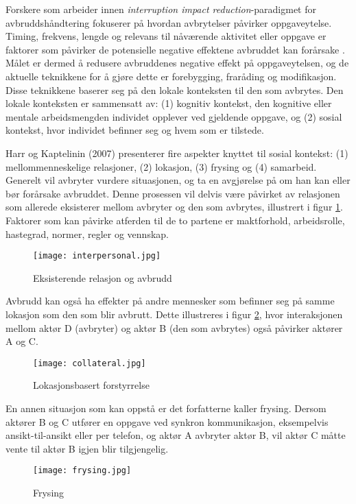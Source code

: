 \noindent
Forskere som arbeider innen \emph{interruption impact reduction}-paradigmet for avbruddshåndtering fokuserer på hvordan avbrytelser påvirker oppgaveytelse. Timing, frekvens, lengde og relevans til nåværende aktivitet eller oppgave er faktorer som påvirker de potensielle negative effektene avbruddet kan forårsake \citep{Grandhi10, Harr07}.
Målet er dermed å redusere avbruddenes negative effekt på oppgaveytelsen, og de aktuelle teknikkene for å gjøre dette er forebygging, fraråding og modifikasjon. Disse teknikkene baserer seg på den lokale konteksten til den som avbrytes. Den lokale konteksten er sammensatt av: (1) kognitiv kontekst, den kognitive eller mentale arbeidsmengden individet opplever ved gjeldende oppgave, og (2) sosial kontekst, hvor individet befinner seg og hvem som er tilstede. 
 
\noindent
Harr og Kaptelinin (2007) presenterer fire aspekter knyttet til sosial kontekst: (1) mellommenneskelige relasjoner, (2) lokasjon, (3) frysing og (4) samarbeid.
\noindent
Generelt vil avbryter vurdere situasjonen, og ta en avgjørelse på om han kan eller bør forårsake avbruddet. Denne prosessen vil delvis være påvirket av relasjonen som allerede eksisterer mellom avbryter og den som avbrytes, illustrert i figur \ref{interpersonal}. Faktorer som kan påvirke atferden til de to partene er maktforhold, arbeidsrolle, hastegrad, normer, regler og vennskap. 
\begin{figure}[H]
\centering
\texttt{[image: interpersonal.jpg]}
\caption{Eksisterende relasjon og avbrudd}
\label{interpersonal}
\end{figure}

\noindent
Avbrudd kan også ha effekter på andre mennesker som befinner seg på samme lokasjon som den som blir avbrutt. Dette illustreres i figur \ref{collateral}, hvor interaksjonen mellom aktør D (avbryter) og aktør B (den som avbrytes) også påvirker aktører A og C.
\begin{figure}[H]
\centering
\texttt{[image: collateral.jpg]}
\caption{Lokasjonsbasert forstyrrelse}
\label{collateral}
\end{figure}

\noindent
En annen situasjon som kan oppstå er det forfatterne kaller frysing. Dersom aktører B og C utfører en oppgave ved synkron kommunikasjon, eksempelvis ansikt-til-ansikt eller per telefon, og aktør A avbryter aktør B, vil aktør C måtte vente til aktør B igjen blir tilgjengelig. 
\begin{figure}[H]
\centering
\texttt{[image: frysing.jpg]}
\caption{Frysing}
\label{frysing}
\end{figure}

